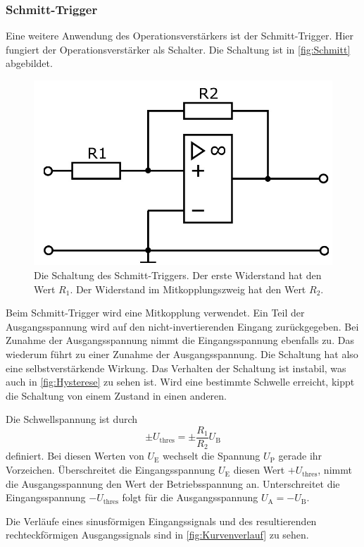 \subsubsection{Schmitt-Trigger}
Eine weitere Anwendung des Operationsverstärkers ist der Schmitt-Trigger. Hier fungiert der Operationsverstärker als Schalter. Die Schaltung ist in \autoref{fig:Schmitt} abgebildet.

\begin{figure}
    \centering
    \includegraphics[width=0.6\linewidth]{./figures/4_Schmitt.jpeg}
    \caption{Die Schaltung des Schmitt-Triggers. Der erste Widerstand hat den Wert $R_1$. Der Widerstand im Mitkopplungszweig hat den Wert $R_2$. \cite{V51}}
    \label{fig:Schmitt}
\end{figure}

Beim Schmitt-Trigger wird eine Mitkopplung verwendet. Ein Teil der Ausgangsspannung wird auf den nicht-invertierenden Eingang zurückgegeben. Bei Zunahme der Ausgangsspannung nimmt die Eingangsspannung ebenfalls zu. Das wiederum führt zu einer Zunahme der Ausgangsspannung. Die Schaltung hat also eine selbstverstärkende Wirkung.
Das Verhalten der Schaltung ist instabil, was auch in \autoref{fig:Hysterese} zu sehen ist. Wird eine bestimmte Schwelle erreicht, kippt die Schaltung von einem Zustand in einen anderen.

Die Schwellspannung ist durch 
\begin{equation}
    \pm U_\text{thres} = \pm \frac{R_1}{R_2} U_\text{B}
    \label{eq:Schwelle}
\end{equation}
definiert. Bei diesen Werten von $U_\text{E}$ wechselt die Spannung $U_\text{P}$ gerade ihr Vorzeichen.
Überschreitet die Eingangsspannung $U_\text{E}$ diesen Wert $+ U_\text{thres}$, nimmt die Ausgangsspannung den Wert der Betriebsspannung an. Unterschreitet die Eingangsspannung $- U_\text{thres}$ folgt für die Ausgangsspannung $U_\text{A} = - U_\text{B}$.

Die Verläufe eines sinusförmigen Eingangssignals und des resultierenden rechteckförmigen Ausgangssignals sind in \autoref{fig:Kurvenverlauf} zu sehen.

